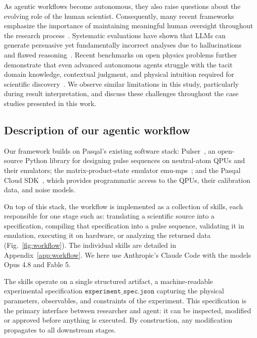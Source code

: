 \documentclass[aps,pra,reprint,amssymb,superscriptaddress,nofootinbib,floatfix]{revtex4-2}
\begin{document}
As agentic workflows become autonomous, they also raise questions about the evolving role of the human scientist. Consequently, many recent frameworks emphasize the importance of maintaining meaningful human oversight throughout the research process~\cite{kumar2024applications, tang2025risks}. Systematic evaluations have shown that LLMs can generate persuasive yet fundamentally incorrect analyses due to hallucinations and flawed reasoning~\cite{messeri2024illusions,huang2024selfcorrect}. Recent benchmarks on open physics problems further demonstrate that even advanced autonomous agents struggle with the tacit domain knowledge, contextual judgment, and physical intuition required for scientific discovery~\cite{malinowski2026aiphysics}. We observe similar limitations in this study, particularly during result interpretation, and discuss these challenges throughout the case studies presented in this work. 




\subsection{Description of our agentic workflow}

Our framework builds on Pasqal's existing software stack: Pulser~\cite{silverio2022pulser}, an open-source Python library for designing pulse sequences on neutral-atom QPUs and their emulators; the matrix-product-state emulator emu-mps~\cite{bidzhiev2025emulation}; and the Pasqal Cloud SDK~\cite{pasqal-cloud-sdk-github,wennersteen2026hybrid}, which provides programmatic access to the QPUs, their calibration data, and noise models.

On top of this stack, the workflow is implemented as a collection of skills, each responsible for one stage such as: translating a scientific source into a specification, compiling that specification into a pulse sequence, validating it in emulation, executing it on hardware, or analyzing the returned data (Fig.~\ref{fig:workflow}). The individual skills are detailed in Appendix~\ref{app:workflow}. We here use Anthropic’s Claude Code with the models Opus 4.8 and Fable 5.

The skills operate on a single structured artifact, a machine-readable experimental specification $\texttt{experiment_spec.json}$ capturing the physical parameters, observables, and constraints of the experiment. This specification is the primary interface between researcher and agent: it can be inspected, modified or approved before anything is executed. By construction, any modification propagates to all downstream stages.
\end{document}
